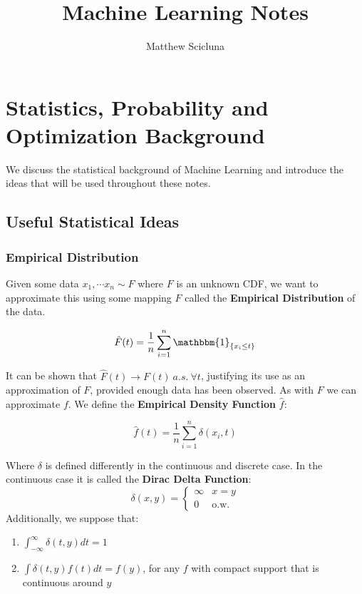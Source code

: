 \documentclass[]{article}
\theoremstyle{mattstyle}
\theoremstyle{definition}
\begin{document}
\title{Machine Learning Notes}
\author{Matthew Scicluna}
\maketitle

\newpage

\tableofcontents

\newpage

\section{Statistics, Probability and Optimization Background}

We discuss the statistical background of Machine Learning and introduce the ideas that will be used throughout these notes.

\subsection{Useful Statistical Ideas}

\subsubsection{Empirical Distribution}\label{sec:empdist}

Given some data \(x_1, \cdots x_n \sim F\) where $F$ is an unknown CDF, we want to approximate this using some mapping $\hat{F}$ called the \textbf{Empirical Distribution} of the data.

\begin{equation}
	\hat{F}(t) = \frac{1}{n}\sum_{i=1}^n \mathbbm{1}_{\{x_i \le t\}}
\end{equation} 

It can be shown that $\hat{F}(t) \rightarrow F(t) \ a.s.\ \forall t$, justifying its use as an approximation of $F$, provided enough data has been observed. As with $F$ we can approximate $f$. We define the \textbf{Empirical Density Function} $\hat{f}$:

\begin{equation}
	\hat{f}(t) = \frac{1}{n}\sum_{i=1}^n \delta(x_i, t)
\end{equation}

Where $\delta$ is defined differently in the continuous and discrete case. In the continuous case it is called the \textbf{Dirac Delta Function}:
	\begin{equation}
		\delta(x,y) = \begin{cases}
		\infty & x=y \\
		0 & \text{o.w.}
	\end{cases}
	\end{equation}
	Additionally, we suppose that:
	\begin{enumerate}
		\item $\int_{-\infty}^{\infty} \delta(t,y)dt = 1$
		\item $\int \delta(t,y) f(t) dt = f(y)$, for any $f$ with compact support that is continuous around $y$
	\end{enumerate}
\end{document}
